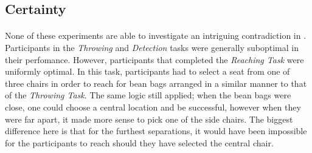 \documentclass[12pt]{article}
\begin{document}
%
\subsection*{Certainty}
\paragraph{} None of these experiments are able to investigate an intriguing contradiction in \cite{clarke2015failure}. Participants in the \textit{Throwing} and \textit{Detection} tasks were generally suboptimal in their perfomance. However, participants that completed the \textit{Reaching Task} were uniformly optimal. In this task, participants had to select a seat from one of three chairs in order to reach for bean bags arranged in a similar manner to that of the \textit{Throwing Task}. The same logic still applied; when the bean bags were close, one could choose a central location and be successful, however when they were far apart, it made more sense to pick one of the side chairs. The biggest difference here is that for the furthest separations, it would have been impossible for the participants to reach should they have selected the central chair. 
\end{document}
